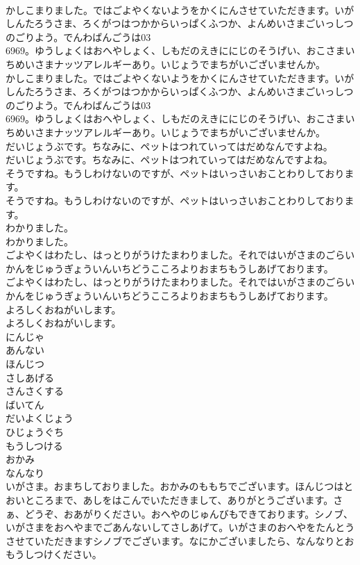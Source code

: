 \documentclass[8pt]{extreport}
\begin{document}
\begin{CJK}{UTF8}{min}
\\	かしこまりました。ではごよやくないようをかくにんさせていただきます。いが　しんたろうさま、ろくがつはつかからいっぱくふつか、よんめいさまごいっしつのごりよう。でんわばんごうは03
\\	6969。ゆうしょくはおへやしょく、しもだのえきににじのそうげい、おこさまいちめいさまナッツアレルギーあり。いじょうでまちがいございませんか。
\\	かしこまりました。ではごよやくないようをかくにんさせていただきます。いが　しんたろうさま、ろくがつはつかからいっぱくふつか、よんめいさまごいっしつのごりよう。でんわばんごうは03
\\	6969。ゆうしょくはおへやしょく、しもだのえきににじのそうげい、おこさまいちめいさまナッツアレルギーあり。いじょうでまちがいございませんか。
\\	だいじょうぶです。ちなみに、ペットはつれていってはだめなんですよね。
\\	だいじょうぶです。ちなみに、ペットはつれていってはだめなんですよね。
\\	そうですね。もうしわけないのですが、ペットはいっさいおことわりしております。
\\	そうですね。もうしわけないのですが、ペットはいっさいおことわりしております。
\\	わかりました。
\\	わかりました。
\\	ごよやくはわたし、はっとりがうけたまわりました。それではいがさまのごらいかんをじゅうぎょういんいちどうこころよりおまちもうしあげております。
\\	ごよやくはわたし、はっとりがうけたまわりました。それではいがさまのごらいかんをじゅうぎょういんいちどうこころよりおまちもうしあげております。
\\	よろしくおねがいします。
\\	よろしくおねがいします。
\\	にんじゃ
\\	あんない
\\	ほんじつ
\\	さしあげる
\\	さんさくする
\\	ばいてん
\\	だいよくじょう
\\	ひじょうぐち
\\	もうしつける
\\	おかみ
\\	なんなり
\\	いがさま。おまちしておりました。おかみのももちでございます。ほんじつはとおいところまで、あしをはこんでいただきまして、ありがとうございます。さぁ、どうぞ、おあがりください。おへやのじゅんびもできております。シノブ、いがさまをおへやまでごあんないしてさしあげて。いがさまのおへやをたんとうさせていただきますシノブでございます。なにかございましたら、なんなりとおもうしつけください。

\end{CJK}
\end{document}
